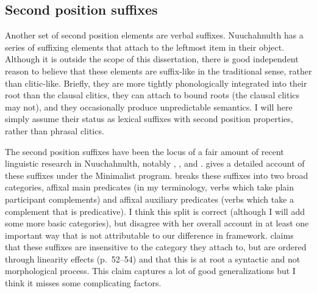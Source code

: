 \subsection{Second position suffixes} \label{ch:clause:2pv}

Another set of second position elements are verbal suffixes. Nuuchahnulth has a series of suffixing elements that attach to the leftmost item in their object. Although it is outside the scope of this dissertation, there is good independent reason to believe that these elements are suffix-like in the traditional sense, rather than clitic-like. Briefly, they are more tightly phonologically integrated into their root than the clausal clitics, they can attach to bound roots (the clausal clitics may not), and they occasionally produce unpredictable semantics. I will here simply assume their status as lexical suffixes with second position properties, rather than phrasal clitics.

The second position suffixes have been the locus of a fair amount of recent linguistic research in Nuuchahnulth, notably \cite{waldie2004}, \cite{wojdak2005}, and \cite{woo2007b}. \cite{wojdak2005} gives a detailed account of these suffixes under the Minimalist program. \citeauthor{wojdak2005} breaks these suffixes into two broad categories, affixal main predicates (in my terminology, verbs which take plain participant complements) and affixal auxiliary predicates (verbs which take a complement that is predicative). I think this split is correct (although I will add some more basic categories), but disagree with her overall account in at least one important way that is not attributable to our difference in framework. \citeauthor{wojdak2005} claims that these suffixes are insensitive to the category they attach to, but are ordered through linearity effects (p.\ 52--54) and that this is at root a syntactic and not morphological process. This claim captures a lot of good generalizations but I think it misses some complicating factors.

